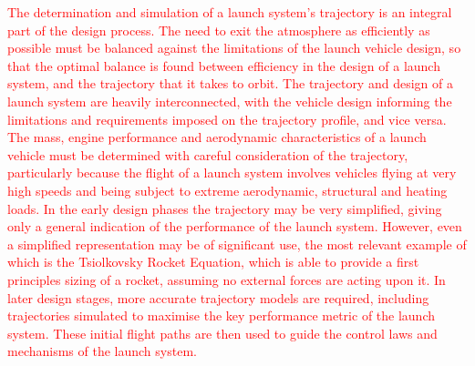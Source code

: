 \textcolor{red}{
	The determination and simulation of a launch system's trajectory is an integral part of the design process. The need to exit the atmosphere as efficiently as possible must be balanced against the limitations of the launch vehicle design, so that the optimal balance is found between efficiency in the design of a launch system, and the trajectory that it takes to orbit. 
	 The trajectory and design of a launch system are heavily interconnected, with the vehicle design informing the limitations and requirements imposed on the trajectory profile, and vice versa. 
	 The mass, engine performance and aerodynamic characteristics of a launch vehicle must be determined with careful consideration of the trajectory, particularly because the flight of a launch system involves vehicles flying at very high speeds and being subject to extreme aerodynamic, structural and heating loads. In the early design phases the trajectory may be very simplified, giving only a general indication of the performance of the launch system. However, even a simplified representation may be of significant use, the most relevant example of which is the Tsiolkovsky Rocket Equation, which is able to provide a first principles sizing of a rocket, assuming no external forces are acting upon it. In later design stages, more accurate trajectory models are required, including trajectories simulated to maximise the key performance metric of the launch system. These initial flight paths are then used to guide the control laws and mechanisms of the launch system.
}

